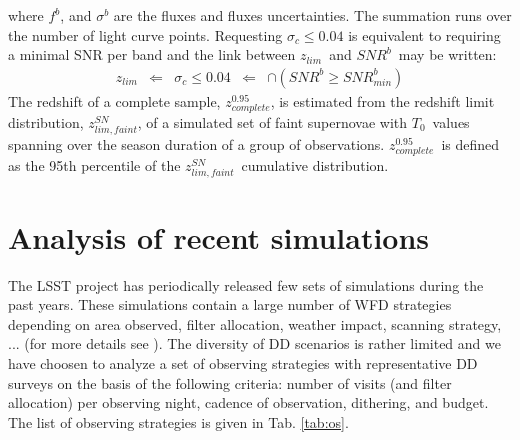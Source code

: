 \documentclass[skiphelvet,twocolumn]{aastex63}
\newcommand{\snrb}{\mbox{$SNR^b$}}
\newcommand{\snrbmin}{\mbox{$SNR^b_{min}$}}
\newcommand{\daymax}{$T_0$}
\newcommand{\sigc}{\mbox{$\sigma_c$}}
\newcommand{\zlim}{\mbox{$z_{lim}$}}
\newcommand{\zlimfaint}{\mbox{$z_{lim,faint}^{SN}$}}
\newcommand{\zcompb}{\mbox{$z_{complete}^{0.95}$}}
\begin{document}
where $f^b$, and $\sigma^b$ are the fluxes and fluxes uncertainties. The summation runs over the number of light curve points. Requesting \sigc$\leq 0.04$ is equivalent to requiring a minimal SNR per band and the link between \zlim~and \snrb~may be written:
\begin{equation}
  \begin{aligned}
    \zlim &\Longleftarrow & \sigc \leq 0.04 & \Longleftarrow &\cap (\snrb \geq \snrbmin)
    \end{aligned}
 \label{eq:zlimsnr}
\end{equation}
The redshift of a complete sample, \zcompb, is estimated from the redshift limit distribution, \zlimfaint, of a simulated set of faint supernovae with \daymax~values spanning over the season duration of a group of observations. \zcompb~is defined as the 95th percentile of the \zlimfaint~cumulative distribution.


\section{Analysis of recent simulations}
\label{sec:analysis}
The LSST project has periodically released few sets of simulations during the past years. These simulations contain a large number of WFD strategies depending on area observed, filter allocation, weather impact, scanning strategy, ... (for more details see ). The diversity of DD scenarios is rather limited and we have choosen to analyze a set of observing strategies with representative DD surveys on the basis of the following criteria: number of visits (and filter allocation) per observing night, cadence of observation, dithering, and budget. The list of observing strategies is given in Tab. \ref{tab:os}.
\end{document}
